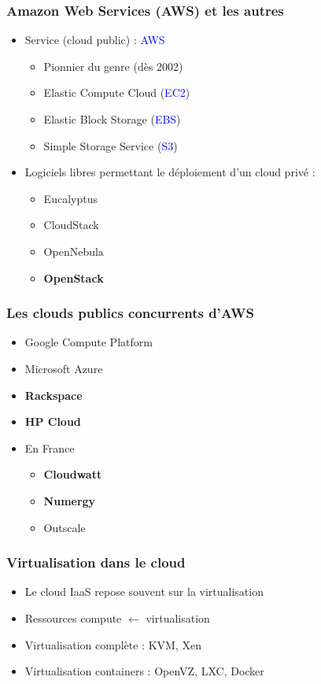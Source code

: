   \begin{frame}
    \frametitle{Amazon Web Services (AWS) et les autres}
    \begin{itemize}
      \item Service (cloud public) : \textcolor{blue}{AWS}
      \begin{itemize}
        \item Pionnier du genre (dès 2002)\pause
        \item Elastic Compute Cloud (\textcolor{blue}{EC2})
        \item Elastic Block Storage (\textcolor{blue}{EBS})\pause
        \item Simple Storage Service (\textcolor{blue}{S3})\pause
      \end{itemize}
        \item Logiciels libres permettant le déploiement d'un cloud privé :
      \begin{itemize}
        \item Eucalyptus
        \item CloudStack
        \item OpenNebula\pause
        \item \textbf{OpenStack}
      \end{itemize}
    \end{itemize}
  \end{frame}

  \begin{frame}
    \frametitle{Les clouds publics concurrents d'AWS}
    \begin{itemize}
      \item Google Compute Platform
      \item Microsoft Azure
      \item \textbf<3->{Rackspace}
      \item \textbf<3->{HP Cloud}\pause
      \item En France
      \begin{itemize}
        \item \textbf<3->{Cloudwatt}
        \item \textbf<3->{Numergy}
        \item Outscale
      \end{itemize}
    \end{itemize}
  \end{frame}

  \begin{frame}
    \frametitle{Virtualisation dans le cloud}
    \begin{itemize}
      \item Le cloud IaaS repose souvent sur la virtualisation
      \item Ressources compute $\leftarrow$ virtualisation
      \item Virtualisation complète : KVM, Xen
      \item Virtualisation containers : OpenVZ, LXC, Docker
    \end{itemize}
  \end{frame}

